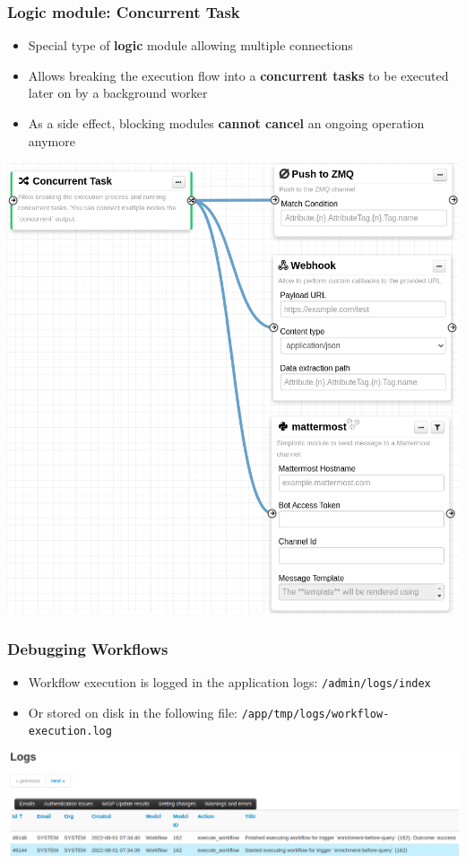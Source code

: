 \begin{frame}
    \frametitle{Logic module: Concurrent Task}
    \begin{itemize}
        \item Special type of \textbf{logic} module allowing multiple connections
        \item Allows breaking the execution flow into a \textbf{concurrent tasks} to be executed later on by a background worker
        \item As a side effect, blocking modules \textbf{cannot cancel} an ongoing operation anymore
    \end{itemize}
    \begin{center}
        \includegraphics[width=0.45\linewidth]{pictures/module-concurrent.png}
    \end{center}
\end{frame}

\begin{frame}
    \frametitle{Debugging Workflows}
    \begin{itemize}
        \item Workflow execution is logged in the application logs: \texttt{/admin/logs/index}
        \item Or stored on disk in the following file: \texttt{/app/tmp/logs/workflow-execution.log}
    \end{itemize}
    \begin{center}
        \includegraphics[width=1.0\linewidth]{pictures/workflow-debug.png}
    \end{center}
\end{frame}

